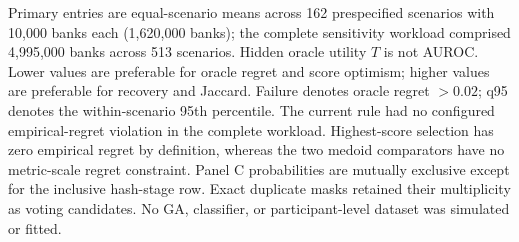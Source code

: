 \begin{table}[H]
\begin{minipage}{0.98\linewidth}\scriptsize\vspace{0.35em}
Primary entries are equal-scenario means across 162 prespecified scenarios with 10,000 banks each (1,620,000 banks); the complete sensitivity workload comprised 4,995,000 banks across 513 scenarios. Hidden oracle utility $T$ is not AUROC. Lower values are preferable for oracle regret and score optimism; higher values are preferable for recovery and Jaccard. Failure denotes oracle regret $>0.02$; q95 denotes the within-scenario 95th percentile. The current rule had no configured empirical-regret violation in the complete workload. Highest-score selection has zero empirical regret by definition, whereas the two medoid comparators have no metric-scale regret constraint. Panel C probabilities are mutually exclusive except for the inclusive hash-stage row. Exact duplicate masks retained their multiplicity as voting candidates. No GA, classifier, or participant-level dataset was simulated or fitted.
\end{minipage}
\end{table}
